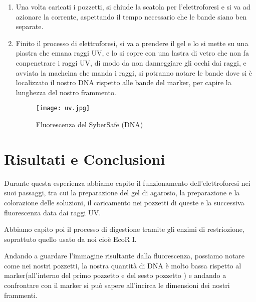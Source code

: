 \documentclass{article}
\begin{document}
\begin{enumerate}
\begin{figure}[H]
\end{figure}

\item Una volta caricati i pozzetti, si chiude la scatola per l'elettroforesi e si va ad azionare la corrente, aspettando il tempo necessario che le bande siano ben separate.

\item Finito il processo di elettroforesi, si va a prendere il gel e lo si mette su una piastra che emana raggi UV, e lo si copre con una lastra di vetro che non fa conpenetrare i raggi UV, di modo da non danneggiare gli occhi dai raggi, e avviata la machcina che manda i raggi, si potranno notare le bande dove si è localizzato il nostro DNA rispetto alle bande del marker, per capire la lunghezza del nostro frammento.

\begin{figure}[H]

\centering
\texttt{[image: uv.jpg]}
\caption{Fluorescenza del SyberSafe (DNA)}
\label{SyberSafe}

\end{figure}



\end{enumerate}


\section{Risultati e Conclusioni}

Durante questa esperienza abbiamo capito il funzionamento dell'elettroforesi nei suoi passaggi, tra cui la preparazione del gel di agarosio, la preparazione e la colorazione delle soluzioni, il caricamento nei pozzetti di queste e la successiva fluorescenza data dai raggi UV. 

Abbiamo capito poi il processo di digestione tramite gli enzimi di restriozione, soprattuto quello usato da noi cioè EcoR I.

Andando a guardare l'immagine risultante dalla fluorescenza, possiamo notare come nei nostri pozzetti, la nostra quantità di DNA è molto bassa rispetto al marker(all'interno del primo pozzetto e del sesto pozzetto ) e andando a confrontare con il marker si può sapere all'incirca le dimensioni dei nostri frammenti. 
\end{document}
